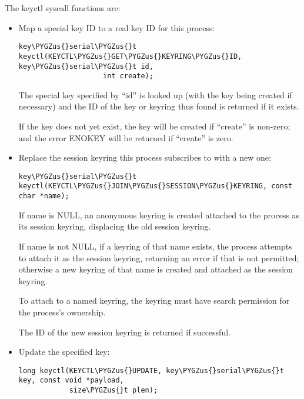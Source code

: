 \documentclass[a4paper,8pt,english]{sphinxmanual}
\def\PYGZus{\char`\_}
\begin{document}
The keyctl syscall functions are:
\begin{itemize}
\item {} 
Map a special key ID to a real key ID for this process:

\begin{Verbatim}[commandchars=\\\{\}]
key\PYGZus{}serial\PYGZus{}t keyctl(KEYCTL\PYGZus{}GET\PYGZus{}KEYRING\PYGZus{}ID, key\PYGZus{}serial\PYGZus{}t id,
                    int create);
\end{Verbatim}

The special key specified by ``id'' is looked up (with the key being created
if necessary) and the ID of the key or keyring thus found is returned if
it exists.

If the key does not yet exist, the key will be created if ``create'' is
non-zero; and the error ENOKEY will be returned if ``create'' is zero.

\item {} 
Replace the session keyring this process subscribes to with a new one:

\begin{Verbatim}[commandchars=\\\{\}]
key\PYGZus{}serial\PYGZus{}t keyctl(KEYCTL\PYGZus{}JOIN\PYGZus{}SESSION\PYGZus{}KEYRING, const char *name);
\end{Verbatim}

If name is NULL, an anonymous keyring is created attached to the process
as its session keyring, displacing the old session keyring.

If name is not NULL, if a keyring of that name exists, the process
attempts to attach it as the session keyring, returning an error if that
is not permitted; otherwise a new keyring of that name is created and
attached as the session keyring.

To attach to a named keyring, the keyring must have search permission for
the process's ownership.

The ID of the new session keyring is returned if successful.

\item {} 
Update the specified key:

\begin{Verbatim}[commandchars=\\\{\}]
long keyctl(KEYCTL\PYGZus{}UPDATE, key\PYGZus{}serial\PYGZus{}t key, const void *payload,
            size\PYGZus{}t plen);
\end{Verbatim}


\end{itemize}
\end{document}
